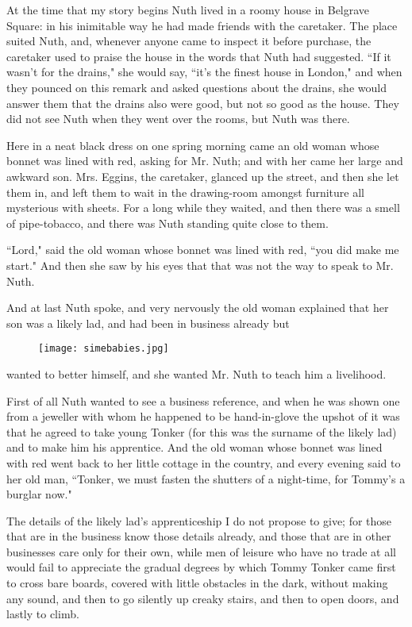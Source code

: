 \documentclass[12pt]{article}
\begin{document}
At the time that my story begins Nuth lived in a roomy house in
Belgrave Square: in his inimitable way he had made friends with the
caretaker. The place suited Nuth, and, whenever anyone came to inspect
it before purchase, the caretaker used to praise the house in the
words that Nuth had suggested. ``If it wasn't for the drains," she
would say, ``it's the finest house in London," and when they pounced on
this remark and asked questions about the drains, she would answer
them that the drains also were good, but not so good as the house.
They did not see Nuth when they went over the rooms, but Nuth was
there.

Here in a neat black dress on one spring morning came an old woman
whose bonnet was lined with red, asking for Mr. Nuth; and with her
came her large and awkward son. Mrs. Eggins, the caretaker, glanced up
the street, and then she let them in, and left them to wait in the
drawing-room amongst furniture all mysterious with sheets. For a long
while they waited, and then there was a smell of pipe-tobacco, and
there was Nuth standing quite close to them.

``Lord," said the old woman whose bonnet was lined with red, ``you did
make me start." And then she saw by his eyes that that was not the way
to speak to Mr. Nuth.

And at last Nuth spoke, and very nervously the old woman explained
that her son was a likely lad, and had been in business already but
\begin{figure}[!ht]
\begin{center}
\texttt{[image: simebabies.jpg]}
\end{center}
\end{figure}
wanted to better himself, and she wanted Mr. Nuth to teach him a
livelihood.

First of all Nuth wanted to see a business reference, and when he was
shown one from a jeweller with whom he happened to be hand-in-glove
the upshot of it was that he agreed to take young Tonker (for this was
the surname of the likely lad) and to make him his apprentice. And the
old woman whose bonnet was lined with red went back to her little
cottage in the country, and every evening said to her old man,
``Tonker, we must fasten the shutters of a night-time, for Tommy's a
burglar now."

The details of the likely lad's apprenticeship I do not propose to
give; for those that are in the business know those details already,
and those that are in other businesses care only for their own, while
men of leisure who have no trade at all would fail to appreciate the
gradual degrees by which Tommy Tonker came first to cross bare boards,
covered with little obstacles in the dark, without making any sound,
and then to go silently up creaky stairs, and then to open doors, and
lastly to climb.
\end{document}
